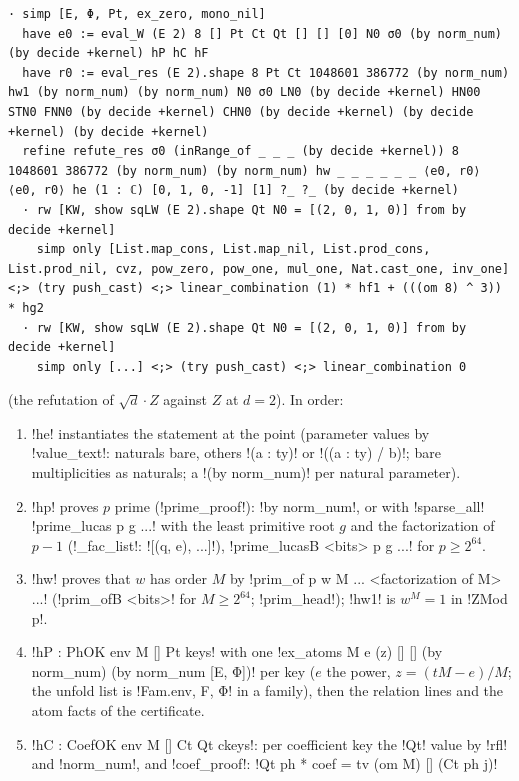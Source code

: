 {{{\begin{lstlisting}[style=lexlean]
    · simp [E, Φ, Pt, ex_zero, mono_nil]
  have e0 := eval_W (E 2) 8 [] Pt Ct Qt [] [] [0] N0 σ0 (by norm_num) (by decide +kernel) hP hC hF
  have r0 := eval_res (E 2).shape 8 Pt Ct 1048601 386772 (by norm_num) hw1 (by norm_num) (by norm_num) N0 σ0 LN0 (by decide +kernel) HN00 STN0 FNN0 (by decide +kernel) CHN0 (by decide +kernel) (by decide +kernel) (by decide +kernel)
  refine refute_res σ0 (inRange_of _ _ _ (by decide +kernel)) 8 1048601 386772 (by norm_num) (by norm_num) hw _ _ _ _ _ _ ⟨e0, r0⟩ ⟨e0, r0⟩ he (1 : ℂ) [0, 1, 0, -1] [1] ?_ ?_ (by decide +kernel)
  · rw [KW, show sqLW (E 2).shape Qt N0 = [(2, 0, 1, 0)] from by decide +kernel]
    simp only [List.map_cons, List.map_nil, List.prod_cons, List.prod_nil, cvz, pow_zero, pow_one, mul_one, Nat.cast_one, inv_one] <;> (try push_cast) <;> linear_combination (1) * hf1 + (((om 8) ^ 3)) * hg2
  · rw [KW, show sqLW (E 2).shape Qt N0 = [(2, 0, 1, 0)] from by decide +kernel]
    simp only [...] <;> (try push_cast) <;> linear_combination 0
\end{lstlisting}
(the refutation of $\sqrt d\cdot Z$ against $Z$ at $d = 2$). In order:
\begin{enumerate}
\item \lexlean!he! instantiates the statement at the point (parameter values by \lexpy!value_text!:
naturals bare, others \lexlean!(a : ty)! or \lexlean!((a : ty) / b)!; bare multiplicities as
naturals; a \lexlean!(by norm_num)! per natural parameter).
\item \lexlean!hp! proves $p$ prime (\lexpy!prime_proof!): \lexlean!by norm_num!, or with
\lexpy!sparse_all! \lexlean!prime_lucas p g ...! with the least primitive root $g$ and the
factorization of $p - 1$ (\lexpy!_fac_list!: \lexlean![(q, e), ...]!), \lexlean!prime_lucasB <bits> p g ...!
for $p \ge 2^{64}$.
\item \lexlean!hw! proves that $w$ has order $M$ by \lexlean!prim_of p w M ... <factorization of M> ...!
(\lexlean!prim_ofB <bits>! for $M \ge 2^{64}$; \lexpy!prim_head!); \lexlean!hw1! is $w^M = 1$ in
\lexlean!ZMod p!.
\item \lexlean!hP : PhOK env M [] Pt keys! with one \lexlean!ex_atoms M e (z) [] [] (by norm_num) (by norm_num [E, Φ])!
per key ($e$ the power, $z = (tM - e)/M$; the unfold list is \lexlean!Fam.env, F, Φ! in a family),
then the relation lines and the atom facts of the certificate.
\item \lexlean!hC : CoefOK env M [] Ct Qt ckeys!: per coefficient key the \lexlean!Qt! value by
\lexlean!rfl! and \lexlean!norm_num!, and \lexpy!coef_proof!: \lexlean!Qt ph * coef = tv (om M) [] (Ct ph j)!

\end{enumerate}}}}
